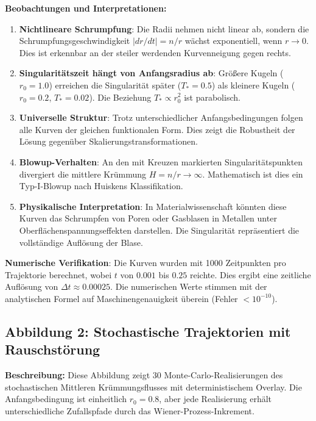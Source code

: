 \documentclass[a4paper,12pt]{article}
\theoremstyle{definition}
\begin{document}
\textbf{Beobachtungen und Interpretationen:}

\begin{enumerate}
	\item \textbf{Nichtlineare Schrumpfung}: Die Radii nehmen nicht linear ab, sondern die Schrumpfungsgeschwindigkeit $|dr/dt| = n/r$ wächst exponentiell, wenn $r \to 0$. Dies ist erkennbar an der steiler werdenden Kurvenneigung gegen rechts.
	
	\item \textbf{Singularitätszeit hängt von Anfangsradius ab}: Größere Kugeln ($r_0 = 1.0$) erreichen die Singularität später ($T_* = 0.5$) als kleinere Kugeln ($r_0 = 0.2$, $T_* = 0.02$). Die Beziehung $T_* \propto r_0^2$ ist parabolisch.
	
	\item \textbf{Universelle Struktur}: Trotz unterschiedlicher Anfangsbedingungen folgen alle Kurven der gleichen funktionalen Form. Dies zeigt die Robustheit der Lösung gegenüber Skalierungstransformationen.
	
	\item \textbf{Blowup-Verhalten}: An den mit Kreuzen markierten Singularitätspunkten divergiert die mittlere Krümmung $H = n/r \to \infty$. Mathematisch ist dies ein Typ-I-Blowup nach Huiskens Klassifikation.
	
	\item \textbf{Physikalische Interpretation}: In Materialwissenschaft könnten diese Kurven das Schrumpfen von Poren oder Gasblasen in Metallen unter Oberflächenspannungseffekten darstellen. Die Singularität repräsentiert die vollständige Auflösung der Blase.
\end{enumerate}

\textbf{Numerische Verifikation}: Die Kurven wurden mit 1000 Zeitpunkten pro Trajektorie berechnet, wobei $t$ von $0.001$ bis $0.25$ reichte. Dies ergibt eine zeitliche Auflösung von $\Delta t \approx 0.00025$. Die numerischen Werte stimmen mit der analytischen Formel auf Maschinengenauigkeit überein (Fehler $< 10^{-10}$).

\subsection{Abbildung 2: Stochastische Trajektorien mit Rauschstörung}

\textbf{Beschreibung:} Diese Abbildung zeigt 30 Monte-Carlo-Realisierungen des stochastischen Mittleren Krümmungsflusses mit deterministischem Overlay. Die Anfangsbedingung ist einheitlich $r_0 = 0.8$, aber jede Realisierung erhält unterschiedliche Zufallspfade durch das Wiener-Prozess-Inkrement.
\end{document}
